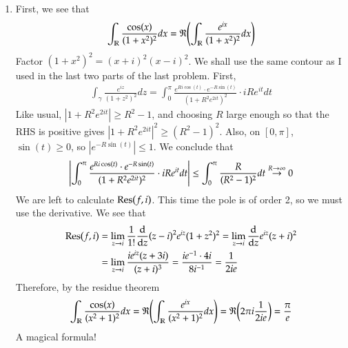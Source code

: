 \documentclass[12pt]{article}
\def\mbb#1{\mathbb{#1}}
\def \R{\mbb{R}}
\theoremstyle{definition}
\theoremstyle{remark}
\renewcommand{\Re}{\mathfrak{R}\qty}
\begin{document}
\begin{enumerate}[leftmargin=\labelsep]
		\item First, we see that
		\begin{align*}
			\int_\R \frac{\cos(x)}{(1+x^2)^2}dx = \Re(\int_{\R} \frac{e^{ix}}{(1+x^2)^2}dx)
		\end{align*}
		Factor $(1+x^2)^2 = (x+i)^2(x-i)^2$. We shall use the same contour as I used in the last two parts of the last problem. First,
		\begin{align*}
			\int_\gamma \frac{e^{iz}}{(1+z^2)^2}dz = \int_0^\pi \frac{e^{Ri\cos(t)} \cdot e^{-R\sin(t)}}{(1+R^2e^{2it})^2} \cdot iRe^{it}dt
		\end{align*}
		Like usual, $|1+R^2e^{2it}| \geq R^2 - 1$, and choosing $R$ large enough so that the RHS is positive gives $|1+R^2e^{2it}|^2 \geq (R^2-1)^2$. Also, on $[0, \pi]$, $\sin(t) \geq 0$, so $|e^{-R\sin(t)}| \leq 1$. We conclude that
		\begin{align*}
			\qty|\int_0^\pi \frac{e^{Ri\cos(t)} \cdot e^{-R\sin(t)}}{(1+R^2e^{2it})^2} \cdot iRe^{it}dt| \leq \int_0^\pi \frac{R}{(R^2-1)^2}dt \overset{R \to \infty}{\to} 0
		\end{align*}
		We are left to calculate $\Res(f, i)$. This time the pole is of order 2, so we must use the derivative. We see that
		\begin{align*}
			\Res(f, i) &= \lim_{z \to i} \frac{1}{1!} \dv{z} (z-i)^2 e^{iz}{(1+z^2)^2} = \lim_{z \to i} \dv{z} e^{iz}{(z+i)^2} \\
			&= \lim_{z \to i} \frac{ie^{iz}(z+3i)}{(z+i)^3} = \frac{ie^{-1} \cdot 4i}{8i^{-1}} = \frac{1}{2ie}
		\end{align*}
		Therefore, by the residue theorem
		\begin{align*}
			\int_{\R} \frac{\cos(x)}{(x^2+1)^2}dx = \Re(\int_\R \frac{e^{ix}}{(x^2+1)^2}dx) = \Re(2\pi i \frac{1}{2ie}) = \frac{\pi}{e}
		\end{align*}
		A magical formula!
		

\end{enumerate}
\end{document}
